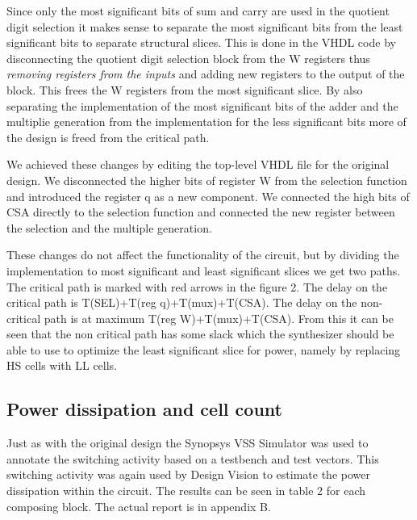 \documentclass[11pt,a4paper]{article}
\begin{document}
\FloatBarrier

Since only the most significant bits of sum and carry are used in the quotient digit selection it makes sense to separate the most significant bits from the least significant bits to separate structural slices. This is done in the VHDL code by disconnecting the quotient digit selection block from the W registers thus \textit{removing registers from the inputs} and adding new registers to the output of the block. This frees the W registers from the most significant slice. By also separating the implementation of the most significant bits of the adder and the multiplie generation from the implementation for the less significant bits more of the design is freed from the critical path.

We achieved these changes by editing the top-level VHDL file for the original design. We disconnected the higher bits of register W from the selection function and introduced the register q as a new component. We connected the high bits of CSA directly to the selection function and connected the new register between the selection and the multiple generation.

These changes do not affect the functionality of the circuit, but by dividing the implementation to most significant and least significant slices we get two paths. The critical path is marked with red arrows in the figure 2. The delay on the critical path is T(SEL)+T(reg q)+T(mux)+T(CSA). The delay on the non-critical path is at maximum T(reg W)+T(mux)+T(CSA). From this it can be seen that the non critical path has some slack which the synthesizer should be able to use to optimize the least significant slice for power, namely by replacing HS cells with LL cells.

\subsection{Power dissipation and cell count}
Just as with the original design the Synopsys VSS Simulator was used to annotate the switching activity based on a testbench and test vectors. This switching activity was again used by Design Vision to estimate the power dissipation within the circuit. The results can be seen in table 2 for each composing block. The actual report is in appendix B.
\end{document}
